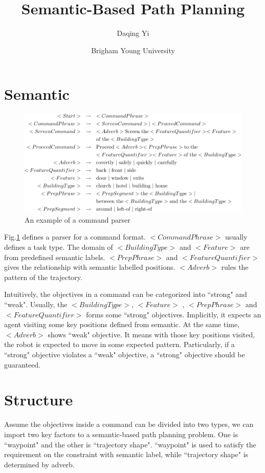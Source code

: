 \documentclass[12pt]{article}
\begin{document}
\title{\textsf{Semantic-Based Path Planning}}
\author{\textsf{Daqing Yi}}
\date{\textsf{Brigham Young University}}

\maketitle

\section{Semantic}

\begin{figure}
\centering
\includegraphics[width=0.7\linewidth]{./command}
\caption{An example of a command parser}
\label{fig:command}
\end{figure}

Fig.\ref{fig:command} defines a parser for a command format. $ <CommandPhrase> $ usually defines a task type. The domain of $ <BuildingType> $ and $ <Feature> $ are from predefined semantic labels. $ <PrepPhrase> $ and $ <FeatureQuantifier> $ gives the relationship with semantic labelled positions. $ <Adverb> $ rules the pattern of the trajectory.

Intuitively, the objectives in a command can be categorized into ``strong" and ``weak". Usually, the $ <BuildingType> $, $ <Feature> $ , $ <PrepPhrase> $ and $ <FeatureQuantifier> $ forms some ``strong" objectives. Implicitly, it expects an agent visiting some key positions defined from semantic. At the same time, $ <Adverb> $ shows ``weak" objective. It means with those key positions visited, the robot is expected to move in some expected pattern. Particularly, if a ``strong" objective violates a ``weak" objective, a ``strong" objective should be guaranteed. 




\section{Structure}

Assume the objectives inside a command can be divided into two types, we can import two key factors to a semantic-based path planning problem. One is ``waypoint" and the other is ``trajectory shape". ``waypoint" is used to satisfy the requirement on the constraint with semantic label, while ``trajectory shape" is determined by adverb.
\end{document}
